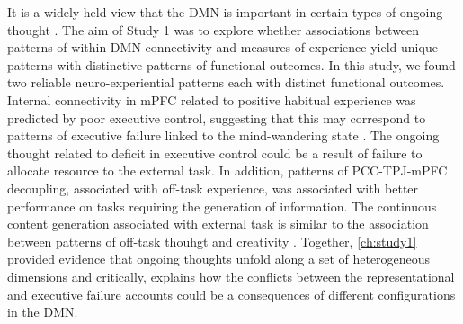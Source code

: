 It is a widely held view that the DMN is important in certain types of ongoing thought \cite<see review from>{SmallwoodSchooler2015}. The aim of Study 1 was to explore whether associations between patterns of within DMN connectivity and measures of experience yield unique patterns with distinctive patterns of functional outcomes. In this study, we found two reliable neuro-experiential patterns each with distinct functional outcomes. Internal connectivity in mPFC related to positive habitual experience was predicted by poor executive control, suggesting that this may correspond to patterns of executive failure linked to the mind-wandering state \cite{McVay2009}. The ongoing thought related to deficit in executive control could be a result of failure to allocate resource to the external task. In addition, patterns of PCC-TPJ-mPFC decoupling, associated with off-task experience, was associated with better performance on tasks requiring the generation of information.  The continuous content generation associated with external task is similar to the association between patterns of off-task thouhgt and creativity \cite{Baird2012}. Together, \cref{ch:study1} provided evidence that ongoing thoughts unfold along a set of heterogeneous dimensions and critically, explains how the conflicts between the representational and executive failure accounts could be a consequences of different configurations in the DMN.

